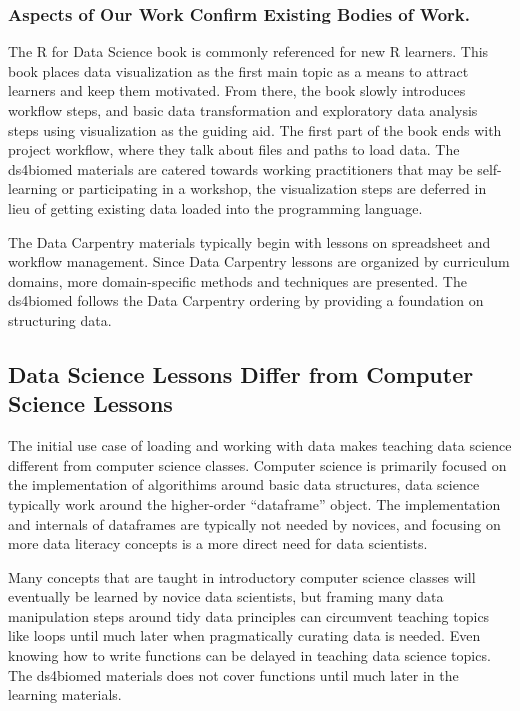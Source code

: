 \documentclass[030-workshop.tex]{subfiles}
\begin{document}
        \subsubsection{Aspects of Our Work Confirm Existing Bodies of Work.}

            The R for Data Science book is commonly referenced for new R learners.
            This book places data visualization as the first main topic as a means to attract learners and keep them motivated.
            From there, the book slowly introduces workflow steps, and basic data transformation and exploratory data analysis
            steps using visualization as the guiding aid.
            The first part of the book ends with project workflow, where they talk about files and paths to load data.
            The ds4biomed materials are catered towards working practitioners that may be self-learning or participating in a workshop,
            the visualization steps are deferred in lieu of getting existing data loaded into the programming language.

            The Data Carpentry materials typically begin with lessons on spreadsheet and workflow management.
            Since Data Carpentry lessons are organized by curriculum domains,
            more domain-specific methods and techniques are presented.
            The ds4biomed follows the Data Carpentry ordering by providing a foundation on structuring data.

    \subsection{Data Science Lessons Differ from Computer Science Lessons}

        The initial use case of loading and working with data makes teaching data science different from computer science classes.
        Computer science is primarily focused on the implementation of algorithims around basic data structures,
        data science typically work around the higher-order ``dataframe'' object.
        The implementation and internals of dataframes are typically not needed by novices,
        and focusing on more data literacy concepts is a more direct need for data scientists.

        Many concepts that are taught in introductory computer science classes will eventually be learned by novice data scientists,
        but framing many data manipulation steps around tidy data principles can circumvent
        teaching topics like loops until much later when pragmatically curating data is needed.
        Even knowing how to write functions can be delayed in teaching data science topics.
        The ds4biomed materials does not cover functions until much later in the learning materials.
\end{document}
